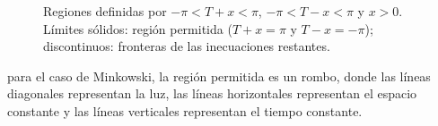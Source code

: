 \begin{figure}[H]
    \caption{Regiones definidas por \(-\pi<T+x<\pi\), \(-\pi<T-x<\pi\) y \(x>0\). Límites sólidos: región permitida (\(T+x=\pi\) y \(T-x=-\pi\)); discontinuos: fronteras de las inecuaciones restantes.}
\end{figure}

para el caso de Minkowski, la región permitida es un rombo, donde las líneas diagonales representan la luz, las líneas horizontales representan el espacio constante y las líneas verticales representan el tiempo constante.






